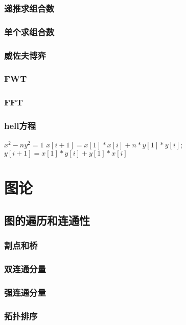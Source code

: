 \documentclass{report}
\begin{document}
        \subsection{递推求组合数}
            
        \subsection{单个求组合数}
            
        \subsection{威佐夫博弈}
            
        \subsection{FWT}
            
        \subsection{FFT}
            
        \subsection{hell方程}
            $ x^2-ny^2 = 1$
            $ x[i+1] = x[1]*x[i] + n*y[1]*y[i]; $
            $ y[i+1] = x[1]*y[i] + y[1]*x[i] $
\chapter{图论}
    \section{图的遍历和连通性}
        \subsection{割点和桥}
            
        \subsection{双连通分量}
            
        \subsection{强连通分量}
            
        \subsection{拓扑排序}
\end{document}
